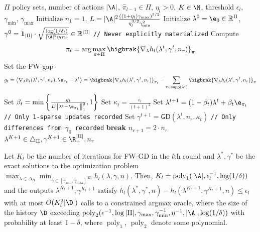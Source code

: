 \documentclass{article}
\newcommand{\kevin}[1]{\textcolor{red}{KGJ:#1}}
\newcommand{\pill}{\widehat{\pi}_{l-1}}
\newcommand{\1}{\mathbf{1}}
\begin{document}
\begin{algorithm}[!htb]
\small
\caption{\textsf{FW-GD}}
\begin{algorithmic}[1]\label{alg:FW}
\REQUIRE $\Pi$ policy sets, number of actions $|\A|$, $\pill\in\Pi$, $\eta_l>0$, $K\in\N$, threshold $\epsilon_l$, $\gamma_{\min}$, $\gamma_{\max}$
\STATE Initialize $n_1=1$, $L=|\A|^2\frac{((1+\eta_l)\gamma_{\max})^{5/2}}{\eta_l^{3/2}\gamma_{\min}^2}$
\STATE Initialize $\lambda^0=\e_{0}\in \mathbb{R}^{\Pi}$, $\gamma^0=\1_{|\Pi|}\cdot\sqrt{\frac{\log(1/\delta_l)}{|\A|^2\eta_l n_r}}\in \mathbb{R}^{|\Pi|}$ \hfill {\color{blue} \texttt{// Never explicitly materialized}}
\STATE Compute 
\begin{equation}\label{eqn:csc}
\pi_t=\arg\max_{\pi\in\Pi}\bigbrak{\nabla_{\lambda} h_l(\lambda^{t},\gamma^{t},n_{r})}_\pi
\end{equation}
\STATE Set the FW-gap \[g_t=\left\langle\nabla_{\lambda}  h_l(\lambda^{t},\gamma^{t},n_{r}),\e_{\pi_t}- \lambda^{t}\right\rangle = \bigbrak{\nabla_{\lambda} h_l(\lambda^{t},\gamma^{t},n_{r})}_{\pi_t}-\sum_{\pi\in \text{supp}(\lambda^{t})} \bigbrak{\nabla_{\lambda} h_l(\lambda^{t},\gamma^{t},n_{r})}_\pi\]
\STATE Set $\beta_t=\min \left\{\frac{g_{t}}{L\left\|\lambda^{t}-\e_{\pi_t}\right\|_1^{2}}, 1\right\}$ %
\STATE Set $\kappa_{t}=\frac{\epsilon_l}{(t+1)^2}$
\STATE Set $\lambda^{t+1}=(1-\beta_t)\lambda^{t}+\beta_t \e_{\pi_t}$\hfill {\color{blue} \texttt{// Only 1-sparse updates recorded}}
\STATE Set $\gamma^{t+1}=\mathsf{GD}(\lambda^{t},n_{r},\kappa_{t})$ \hfill {\color{blue} \texttt{// Only differences from $\gamma_0$ recorded}}
\ENDFOR
{}
\STATE \textbf{break}
\ELSE
\STATE $n_{r+1}=2\cdot n_r$
\ENDIF
\ENDFOR
\ENSURE $\lambda^{K+1}\in\triangle_\Pi,\gamma^{K+1}\in\R_+^{|\Pi|},n_{r}$
\end{algorithmic}
\end{algorithm}

\begin{theorem}\label{thm:computational_efficiency}
Let $K_l$ be the number of iterations for \textsf{FW-GD} in the $l$th round and $\lambda^*,\gamma^*$ be the exact solutions to the optimization problem $\max_{\lambda\in\Delta_\Pi}\min_{\gamma\in[\gamma_{\min},\gamma_{\max}]^{|\Pi|}}h_l(\lambda,\gamma,n)$. Then, $K_l=\operatorname{poly}_1(|\A|,\epsilon_l^{-1},\log(1/\delta))$ and the outputs $\lambda^{K_l+1},\gamma^{K_l+1}$ satisfy $h_l(\lambda^*,\gamma^*,n)-h_l(\lambda^{K_l+1},\gamma^{K_l+1},n)\leq\epsilon_l$ with at most $O(K_l^2|\D|)$ calls to a constrained argmax oracle, where the size of the history $\D$ exceeding $\operatorname{poly}_2(\epsilon^{-1},\log|\Pi|, \gamma_{\max},\gamma_{\min}^{-1}, \eta^{-1},|\A|,\log(1/\delta))$ with probability at least $1-\delta$, where $\operatorname{poly}_1$, $\operatorname{poly}_2$ denote some polynomial. 
\end{theorem}
\end{document}
